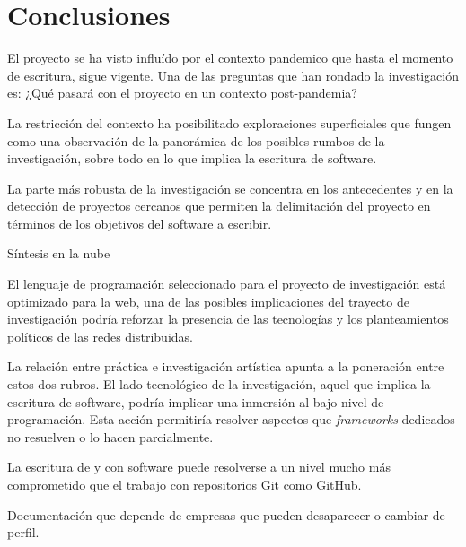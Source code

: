 \section*{Conclusiones}

El proyecto se ha visto influído por el contexto pandemico que hasta el momento de escritura, sigue vigente. Una de las preguntas que han rondado la investigación es: ¿Qué pasará con el proyecto en un contexto post-pandemia? 

La restricción del contexto ha posibilitado exploraciones superficiales que fungen como una observación de la panorámica de los posibles rumbos de la investigación, sobre todo en lo que implica la escritura de software.

La parte más robusta de la investigación se concentra en los antecedentes y en la detección de proyectos cercanos que permiten la delimitación del proyecto en términos de los objetivos del software a escribir. 

Síntesis en la nube 

El lenguaje de programación seleccionado para el proyecto de investigación está optimizado para la web, una de las posibles implicaciones del trayecto de investigación podría reforzar la presencia de las tecnologías y los planteamientos políticos de las redes distribuidas. 

La relación entre práctica e investigación artística apunta a la poneración entre estos dos rubros. El lado tecnológico de la investigación, aquel que implica la escritura de software, podría implicar una inmersión al bajo nivel de programación. Esta acción permitiría resolver aspectos que \textit{frameworks} dedicados no resuelven o lo hacen parcialmente. 


La escritura de y con software puede resolverse a un nivel mucho más comprometido que el trabajo con repositorios Git como GitHub.

Documentación que depende de empresas que pueden desaparecer o cambiar de perfil. 
